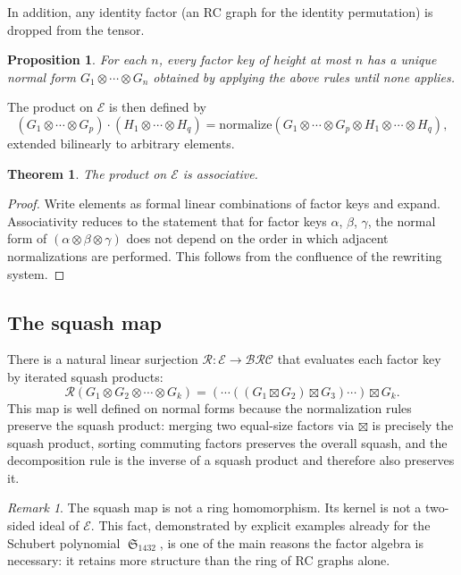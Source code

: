 \documentclass{amsart}
\newtheorem{proposition}[lemma]{Proposition}
\newtheorem{theorem}{Theorem}[section]
\theoremstyle{definition}
\theoremstyle{remark}
\newtheorem*{remark}{Remark}
\numberwithin{equation}{section}
\DeclareMathOperator{\sch}{\mathfrak{S}}
\newcommand{\BRC}{\mathcal{BRC}}
\begin{document}
In addition, any identity factor (an RC graph for the identity permutation) is dropped from the tensor.

\begin{proposition}\label{proposition:confluence}
For each $n$, every factor key of height at most $n$ has a unique normal form $G_1\otimes \cdots \otimes G_n$ obtained by applying the above rules until none applies.
\end{proposition}

The product on $\mathcal{E}$ is then defined by
\[
(G_1 \otimes \cdots \otimes G_p) \cdot (H_1 \otimes \cdots \otimes H_q) = \mathrm{normalize}(G_1 \otimes \cdots \otimes G_p \otimes H_1 \otimes \cdots \otimes H_q),
\]
extended bilinearly to arbitrary elements.

\begin{theorem}\label{theorem:associativity}
The product on $\mathcal{E}$ is associative.
\end{theorem}

\begin{proof}
Write elements as formal linear combinations of factor keys and expand.  Associativity reduces to the statement that for factor keys $\alpha$, $\beta$, $\gamma$, the normal form of $(\alpha \otimes \beta \otimes \gamma)$ does not depend on the order in which adjacent normalizations are performed.  This follows from the confluence of the rewriting system.
\end{proof}

\subsection{The squash map}

There is a natural linear surjection $\mathcal{R} : \mathcal{E} \to \BRC$ that evaluates each factor key by iterated squash products:
\[
\mathcal{R}(G_1 \otimes G_2 \otimes \cdots \otimes G_k) = (\cdots((G_1 \boxtimes G_2) \boxtimes G_3) \cdots) \boxtimes G_k.
\]
This map is well defined on normal forms because the normalization rules preserve the squash product: merging two equal-size factors via $\boxtimes$ is precisely the squash product, sorting commuting factors preserves the overall squash, and the decomposition rule is the inverse of a squash product and therefore also preserves it.

\begin{remark}
The squash map is not a ring homomorphism.  Its kernel is not a two-sided ideal of $\mathcal{E}$.  This fact, demonstrated by explicit examples already for the Schubert polynomial $\sch_{1432}$, is one of the main reasons the factor algebra is necessary: it retains more structure than the ring of RC graphs alone.
\end{remark}
\end{document}
